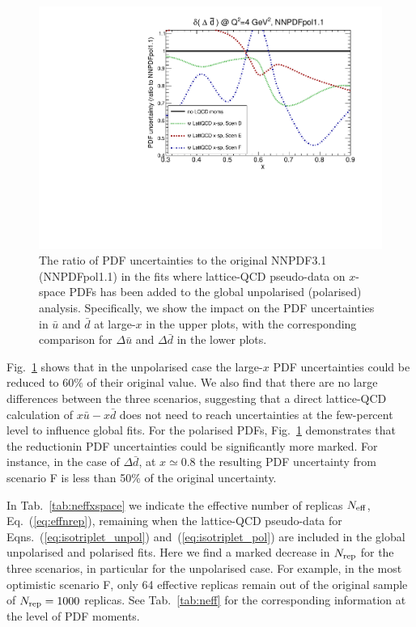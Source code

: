 \begin{figure}[!t]
\includegraphics[scale=0.45]{plots/xdbar-pol-lattice-relerr-xdata-xspace.pdf}
\caption{\small The ratio of PDF uncertainties to the original
  NNPDF3.1 (NNPDFpol1.1) in the fits where lattice-QCD pseudo-data
  on $x$-space PDFs has been added to the global unpolarised
  (polarised) analysis.
  Specifically, we show the impact on the PDF uncertainties
  in $\bar{u}$ and $\bar{d}$ at large-$x$ in the upper
  plots, with the corresponding comparison for $\Delta\bar{u}$
  and $\Delta\bar{d}$ in the lower plots.
}    
\label{fig:impactxspace}
\end{figure}

Fig.~\ref{fig:impactxspace} shows that
in the unpolarised case the large-$x$ PDF uncertainties could be reduced
to $60\%$ of their original value.
%
We also find that there are no large
differences between the three
scenarios, suggesting that a direct lattice-QCD calculation
of $x \bar{u}-x \bar{d}$ does not need to reach uncertainties
at the few-percent level to influence global fits.
%
For​ ​the​ ​polarised​ PDFs,​ ​Fig.~\ref{fig:impactxspace} ​demonstrates​ ​that​ ​the
reduction​ ​in​ ​PDF​ ​uncertainties​ ​could​ ​be​ ​significantly​ ​more​ ​marked.
%
For instance, in the case of $\Delta \bar{d}$, at $x\simeq 0.8$
the resulting PDF uncertainty from scenario F is less than 50\%
of the original uncertainty.

In Tab.~\ref{tab:neffxspace} we indicate the effective number of replicas
$N_{\rm eff}$, Eq.~(\ref{eq:effnrep}), remaining when
the lattice-QCD pseudo-data for Eqns.~(\ref{eq:isotriplet_unpol})
and~(\ref{eq:isotriplet_pol}) are included in the global
   unpolarised and polarised fits.
   Here we find a marked decrease in $N_{\rm rep}$
   for the three scenarios,
   in particular for the unpolarised case.
   For example, in the most optimistic scenario F, only
   64 effective replicas remain out of the
   original sample of $N_{\rm rep}=1000$ replicas.
   See Tab.~\ref{tab:neff} for the corresponding
   information at the level of PDF moments.
   
